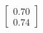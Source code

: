 \documentclass[preview]{standalone}
\begin{document}
\begin{align*}
\begin{bmatrix} 0.70 \\ 0.74 \end{bmatrix}
\end{align*}
\end{document}
